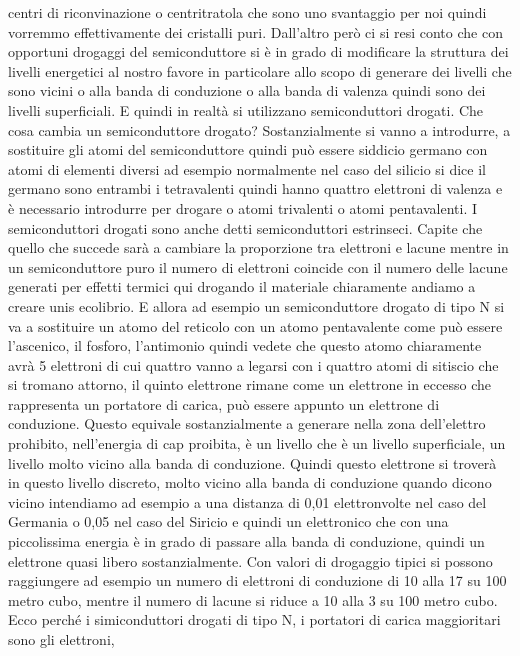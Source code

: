 centri di riconvinazione o centritratola che sono uno svantaggio per noi quindi vorremmo effettivamente dei cristalli puri. Dall'altro però ci si resi conto che con opportuni drogaggi del semiconduttore si è in grado di modificare la struttura dei livelli energetici al nostro favore in particolare allo scopo di generare dei livelli che sono vicini o alla banda di conduzione o alla banda di valenza quindi sono dei livelli superficiali. E quindi in realtà si utilizzano semiconduttori drogati. Che cosa cambia un semiconduttore drogato? Sostanzialmente si vanno a introdurre, a sostituire gli atomi del semiconduttore quindi può essere siddicio germano con atomi di elementi diversi ad esempio normalmente nel caso del silicio si dice il germano sono entrambi i tetravalenti quindi hanno quattro elettroni di valenza e è necessario introdurre per drogare o atomi trivalenti o atomi pentavalenti. I semiconduttori drogati sono anche detti semiconduttori estrinseci. Capite che quello che succede sarà a cambiare la proporzione tra elettroni e lacune mentre in un semiconduttore puro il numero di elettroni coincide con il numero delle lacune generati per effetti termici qui drogando il materiale chiaramente andiamo a creare unis ecolibrio. E allora ad esempio un semiconduttore drogato di tipo N si va a sostituire un atomo del reticolo con un atomo pentavalente come può essere l'ascenico, il fosforo, l'antimonio quindi vedete che questo atomo chiaramente avrà 5 elettroni di cui quattro vanno a legarsi con i quattro atomi di sitiscio che si tromano attorno, il quinto elettrone rimane come un elettrone in eccesso che rappresenta un portatore di carica, può essere appunto un elettrone di conduzione. Questo equivale sostanzialmente a generare nella zona dell'elettro prohibito, nell'energia di cap proibita, è un livello che è un livello superficiale, un livello molto vicino alla banda di conduzione. Quindi questo elettrone si troverà in questo livello discreto, molto vicino alla banda di conduzione quando dicono vicino intendiamo ad esempio a una distanza di 0,01 elettronvolte nel caso del Germania o 0,05 nel caso del Siricio e quindi un elettronico che con una piccolissima energia è in grado di passare alla banda di conduzione, quindi un elettrone quasi libero sostanzialmente. Con valori di drogaggio tipici si possono raggiungere ad esempio un numero di elettroni di conduzione di 10 alla 17 su 100 metro cubo, mentre il numero di lacune si riduce a 10 alla 3 su 100 metro cubo. Ecco perché i simiconduttori drogati di tipo N, i portatori di carica maggioritari sono gli elettroni, 

